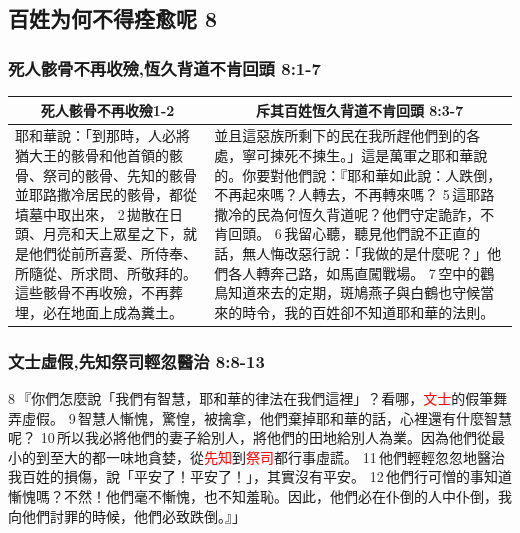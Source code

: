 \subsection{百姓为何不得痊愈呢 8}
\subsubsection{死人骸骨不再收殮,恆久背道不肯回頭 8:1-7}
\begin{table}[H]
\centering
\begin{tabular}{p{6.75cm}|p{10.50cm}}\hline\hline
\multicolumn{1}{c|}{死人骸骨不再收殮1-2}&\multicolumn{1}{c}{斥其百姓恆久背道不肯回頭 8:3-7}\\\hline
耶和華說：「到那時，人必將猶大王的骸骨和他首領的骸骨、祭司的骸骨、先知的骸骨並耶路撒冷居民的骸骨，都從墳墓中取出來， 2 拋散在日頭、月亮和天上眾星之下，就是他們從前所喜愛、所侍奉、所隨從、所求問、所敬拜的。這些骸骨不再收殮，不再葬埋，必在地面上成為糞土。 
&並且這惡族所剩下的民在我所趕他們到的各處，寧可揀死不揀生。」這是萬軍之耶和華說的。你要對他們說：『耶和華如此說：人跌倒，不再起來嗎？人轉去，不再轉來嗎？ 5 這耶路撒冷的民為何恆久背道呢？他們守定詭詐，不肯回頭。 6 我留心聽，聽見他們說不正直的話，無人悔改惡行說：「我做的是什麼呢？」他們各人轉奔己路，如馬直闖戰場。 7 空中的鸛鳥知道來去的定期，斑鳩燕子與白鶴也守候當來的時令，我的百姓卻不知道耶和華的法則。\\\hline
\end{tabular}
\end{table}

\subsubsection{文士虛假,先知祭司輕忽醫治 8:8-13}
8 『你們怎麼說「我們有智慧，耶和華的律法在我們這裡」？看哪，\textcolor{red}{文士}的假筆舞弄虛假。 9 智慧人慚愧，驚惶，被擒拿，他們棄掉耶和華的話，心裡還有什麼智慧呢？ 10 所以我必將他們的妻子給別人，將他們的田地給別人為業。因為他們從最小的到至大的都一味地貪婪，從\textcolor{red}{先知}到\textcolor{red}{祭司}都行事虛謊。 11 他們輕輕忽忽地醫治我百姓的損傷，說「平安了！平安了！」，其實沒有平安。 12 他們行可憎的事知道慚愧嗎？不然！他們毫不慚愧，也不知羞恥。因此，他們必在仆倒的人中仆倒，我向他們討罪的時候，他們必致跌倒。』」

